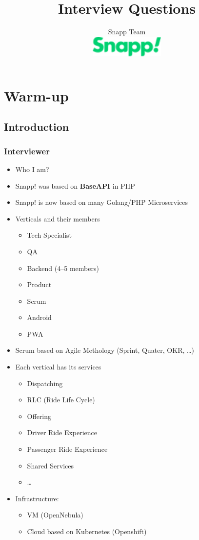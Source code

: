\documentclass[]{book}
\begin{document}
\title{Interview Questions}
\author{%
  Snapp Team \\[1cm]
  \includegraphics[width=10em]{./snapp.png}
}

\maketitle

\chapter{Warm-up}

\section{Introduction}

\subsection{Interviewer}
\begin{itemize}
  \item Who I am?
  \item Snapp! was based on \textbf{BaseAPI} in PHP
  \item Snapp! is now based on many Golang/PHP Microservices
  \item Verticals and their members
    \begin{itemize}
      \item Tech Specialist
      \item QA
      \item Backend (4--5 members)
      \item Product
      \item Scrum
      \item Android
      \item PWA
    \end{itemize}
  \item Scrum based on Agile Methology (Sprint, Quater, OKR, \ldots)
  \item Each vertical has its services
    \begin{itemize}
      \item Dispatching
      \item RLC (Ride Life Cycle)
      \item Offering
      \item Driver Ride Experience
      \item Passenger Ride Experience
      \item Shared Services
      \item \ldots
    \end{itemize}
  \item Infrastructure:
    \begin{itemize}
      \item VM (OpenNebula)
      \item Cloud based on Kubernetes (Openshift)
    \end{itemize}
\end{itemize}
\end{document}
